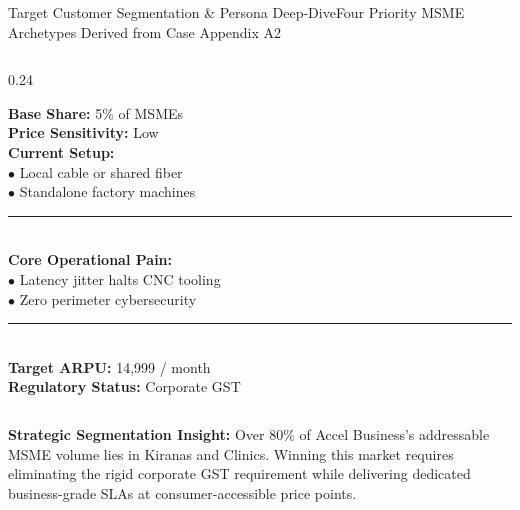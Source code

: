 \documentclass[aspectratio=169,10pt]{beamer}
\newcommand{\inr}{\text{Rs.\ }}
\begin{document}
\begin{frame}{Target Customer Segmentation \& Persona Deep-Dive}{Four Priority MSME Archetypes Derived from Case Appendix A2}
\begin{columns}[T]
    \begin{column}{0.24\textwidth}
      \begin{tcolorbox}[academicbox, title={\fontsize{5.5pt}{6.6pt}\selectfont\textbf{4. Manufacturing}}, coltitle=charcoal]
        {\fontsize{4.8pt}{5.8pt}\selectfont
        \textbf{Base Share:} 5\% of MSMEs \\
        \textbf{Price Sensitivity:} Low \\
        \textbf{Current Setup:} \\
        $\bullet$ Local cable or shared fiber \\
        $\bullet$ Standalone factory machines \\
        \textcolor{bordergray}{\rule{\linewidth}{0.25pt}} \\
        \textbf{Core Operational Pain:} \\
        $\bullet$ Latency jitter halts CNC tooling \\
        $\bullet$ Zero perimeter cybersecurity \\
        \textcolor{bordergray}{\rule{\linewidth}{0.25pt}} \\
        \textbf{Target ARPU:} \inr 14,999 / month \\
        \textbf{Regulatory Status:} Corporate GST
        }
      \end{tcolorbox}
    \end{column}
  \end{columns}

  \vspace{0.06cm}
  \begin{tcolorbox}[accentbox]
    {\fontsize{5.5pt}{6.8pt}\selectfont
    \textbf{Strategic Segmentation Insight:} Over 80\% of Accel Business's addressable MSME volume lies in Kiranas and Clinics. Winning this market requires eliminating the rigid corporate GST requirement while delivering dedicated business-grade SLAs at consumer-accessible price points.
    }
  \end{tcolorbox}
\end{frame}
\end{document}
